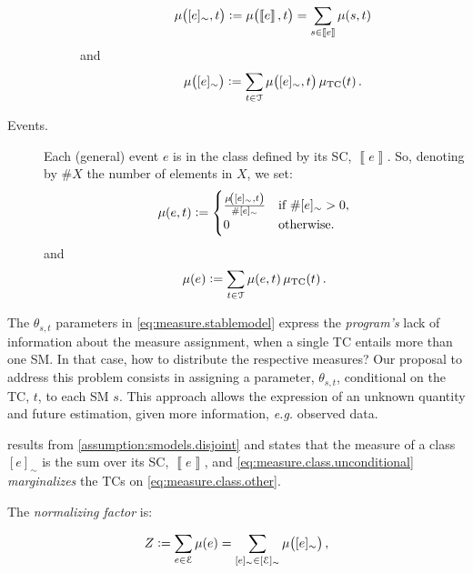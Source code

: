 \documentclass{article}
\newcommand{\at}[1]{\ensuremath{\!\del{#1}}}
\newcommand{\cla}[1]{\ensuremath{{\cal #1}}}
\newcommand{\stablecore}[1]{\ensuremath{\left\llbracket #1 \right\rrbracket}}
\newcommand{\pw}[1]{\ensuremath{\mu\at{#1}}}
\newcommand{\pwcfname}{\ensuremath{\mu_{\textrm{TC}}}}
\newcommand{\pwc}[1]{\ensuremath{\pwcfname\at{#1}}}
\newcommand{\class}[1]{\ensuremath{[{#1}]_{\sim}}}
\newcommand{\TCHOICEset}{\ensuremath{\cla{T}}}
\newcommand{\EVENTSset}{\ensuremath{\cla{E}}}
\begin{document}
\begin{description}
\begin{description}
\begin{equation}
	  \pw{\class{e}, t} := \pw{\stablecore{e}, t} = \sum_{s\in\stablecore{e}}\pw{s, t}
	  \label{eq:measure.class.other}
	\end{equation}
	and
	\begin{equation}
	  \pw{\class{e}} := \sum_{t \in \TCHOICEset} \pw{\class{e}, t}\pwc{t}.
	  \label{eq:measure.class.unconditional}
	\end{equation}
  \end{description}
\item[Events.] \label{item:event.cases} Each (general) event $e$ is in
  the class defined by its \acl{SC}, $\stablecore{e}$.  So, denoting
  by $\# X$ the number of elements in $X$, we set:
  \begin{equation}
	\pw{e, t} :=
	\begin{cases}
	  \frac{\pw{\class{e}, t}}{\# \class{e}} & \text{if~}\# \class{e} > 0, \\
	  0                                      & \text{otherwise}.
	\end{cases}
	\label{eq:measure.events}
  \end{equation}
  and
  \begin{equation}
	\pw{e} := \sum_{t\in\TCHOICEset} \pw{e, t} \pwc{t}.
	\label{eq:measure.events.unconditional}
  \end{equation}
\end{description}

The $\theta_{s,t}$ parameters in \cref{eq:measure.stablemodel} express
the \emph{program's} lack of information about the measure assignment,
when a single \acl{TC} entails more than one \acl{SM}.  In that case,
how to distribute the respective measures? Our proposal to address
this problem consists in assigning a parameter, $\theta_{s,t}$,
conditional on the \acl{TC}, $t$, to each \acl{SM} $s$.  This approach
allows the expression of an unknown quantity and future estimation,
given more information, \textit{e.g.} observed data.

 results from
\cref{assumption:smodels.disjoint} and states that the measure of a
class $\class{e}$ is the sum over its \acl{SC}, $\stablecore{e}$, and
\cref{eq:measure.class.unconditional} \emph{marginalizes} the \acp{TC}
on \cref{eq:measure.class.other}.

The \emph{normalizing factor} is:

\begin{equation*}
	Z :=
	\sum_{e \in \EVENTSset} \pw{e} =
	\sum_{\class{e} \in \class{\EVENTSset}} \pw{\class{e}},
\end{equation*}
\end{document}
